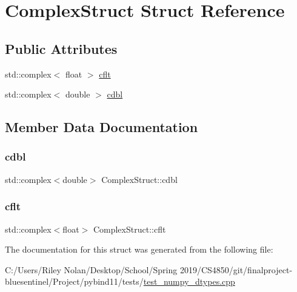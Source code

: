 \hypertarget{struct_complex_struct}{}\section{Complex\+Struct Struct Reference}
\label{struct_complex_struct}
\subsection*{Public Attributes}
\begin{DoxyCompactItemize}
\item 
std\+::complex$<$ float $>$ \mbox{\hyperlink{struct_complex_struct_a58bd9463d043d536040b542c7d6bd79a}{cflt}}
\item 
std\+::complex$<$ double $>$ \mbox{\hyperlink{struct_complex_struct_aa4529bcb0c3715f1ce35c4f338d70ff2}{cdbl}}
\end{DoxyCompactItemize}


\subsection{Member Data Documentation}
\mbox{\label{struct_complex_struct_aa4529bcb0c3715f1ce35c4f338d70ff2}} 
\subsubsection{\texorpdfstring{cdbl}{cdbl}}
{\footnotesize\ttfamily std\+::complex$<$double$>$ Complex\+Struct\+::cdbl}

\mbox{\label{struct_complex_struct_a58bd9463d043d536040b542c7d6bd79a}} 
\subsubsection{\texorpdfstring{cflt}{cflt}}
{\footnotesize\ttfamily std\+::complex$<$float$>$ Complex\+Struct\+::cflt}



The documentation for this struct was generated from the following file\+:\begin{DoxyCompactItemize}
\item 
C\+:/\+Users/\+Riley Nolan/\+Desktop/\+School/\+Spring 2019/\+C\+S4850/git/finalproject-\/bluesentinel/\+Project/pybind11/tests/\mbox{\hyperlink{test__numpy__dtypes_8cpp}{test\+\_\+numpy\+\_\+dtypes.\+cpp}}\end{DoxyCompactItemize}
